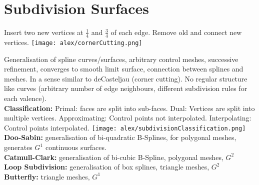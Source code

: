 \section{Subdivision Surfaces}

 Insert two new vertices at $\frac{1}{4}$ and $\frac{3}{4}$ of each edge. Remove old and connect new vertices.
\texttt{[image: alex/cornerCutting.png]}

 Generalisation of spline curves/surfaces, arbitrary control meshes, successive refinement, converges to smooth limit surface, connection between splines and meshes. In a sense similar to deCasteljau (corner cutting). No regular structure like curves (arbitrary number of edge neighbours, different subdivision rules for each valence). \\
\textbf{Classification:} Primal: faces are split into sub-faces. Dual: Vertices are split into multiple vertices. Approximating: Control points not interpolated. Interpolating: Control points interpolated.
\texttt{[image: alex/subdivisionClassification.png]}
\textbf{Doo-Sabin:} generalisation of bi-quadratic B-Splines, for polygonal meshes, generates $G^1$ continuous surfaces.\\
\textbf{Catmull-Clark:} generalisation of bi-cubic B-Spline, polygonal meshes, $G^2$\\
\textbf{Loop Subdivision:} generalisation of box splines, triangle meshes, $G^2$\\
\textbf{Butterfly:} triangle meshes, $G^1$\\


